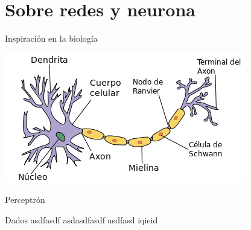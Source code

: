 \documentclass[presentation]{beamer}
\begin{document}
\section{Sobre redes y neurona}
\label{sec:orgd2992d0}
\begin{frame}[label={sec:org9382281}]{Inspiración en la biología}
\begin{center}
\includegraphics[width=.9\linewidth]{images/neurona.png}
\end{center}
\end{frame}

\begin{frame}[label={sec:org7f252a2}]{Perceptrón}
\begin{block}{Dados asdfasdf}
asdasdfasdf asdfasd iqieid
\end{block}
\end{frame}
\end{document}
